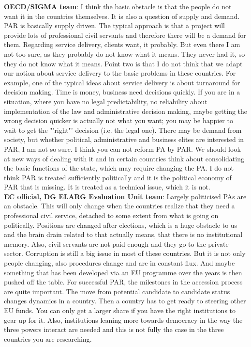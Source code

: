 \textbf{OECD/SIGMA team}: I think the basic obstacle is that the people do not want it in the countries themselves. It is also a question of supply and demand. PAR is basically supply driven. The typical approach is that a project will provide lots of professional civil servants and therefore there will be a demand for them. Regarding service delivery, clients want, it probably. But even there I am not too sure, as they probably do not know what it means. They never had it, so they do not know what it means. Point two is that I do not think that we adapt our notion about service delivery to the basic problems in these countries. For example, one of the typical ideas about service delivery is about turnaround for decision making. Time is money, business need decisions quickly. If you are in a situation, where you have no legal predictability, no reliability about implementation of the law and administrative decision making, maybe getting the wrong decision quicker is actually not what you want; you may be happier to wait to get the "'right"' decision (i.e. the legal one). There may be demand from society, but whether political, administrative and business elites are interested in PAR, I am not so sure. I think you can not reform PA by PAR. We should look at new ways of dealing with it and in certain countries think about consolidating the basic functions of the state, which may require changing the PA. I do not think PAR is treated sufficiently politically and it is the political economy of PAR that is missing. It is treated as a technical issue, which it is not. \\
\textbf{EC official, DG ELARG Evaluation Unit team}: Largely politicised PAs are an obstacle. This will only change when the countries realize that they need a professional civil service, detached to some extent from what is going on politically. Positions are changed after elections, which is a huge obstacle to us and the brain drain related to that actually means, that there is no institutional memory. Also, civil servants are not paid enough and they go to the private sector. Corruption is still a big issue in most of these countries. But it is not only people changing, also procedures change and are in constant flux. And maybe something that has been developed via an EU programme over the years is then pushed off the table. For successful PAR, the milestones in the accession process are quite important. The move from potential candidate to candidate status changes dynamics in a country. Then a country has to get ready to steering other EU funds. You can only get a larger share if you have the right institutions to gear up for it. Also, institutions leaning more towards democracy in the way the three powers interact are needed and this is not fully the case in the three countries you are researching. \\
